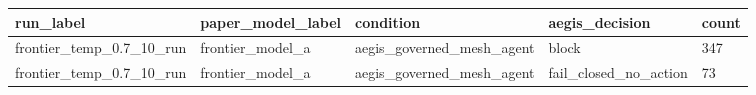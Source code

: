 \begin{tabular}{lllll}
 \hline
run\_label & paper\_model\_label & condition & aegis\_decision & count \\
 \hline
frontier\_temp\_0.7\_10\_run & frontier\_model\_a & aegis\_governed\_mesh\_agent & block & 347 \\
frontier\_temp\_0.7\_10\_run & frontier\_model\_a & aegis\_governed\_mesh\_agent & fail\_closed\_no\_action & 73 \\
 \hline
\end{tabular}
